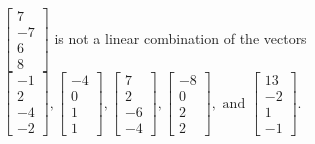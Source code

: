 \begin{exercise}
\begin{exerciseStatement}
  \end{exerciseStatement}
  \begin{exerciseAnswer}
   \(\left[\begin{array}{c}
7 \\
-7 \\
6 \\
8
\end{array}\right]\) 
  	 is not  
	a linear combination of the vectors \(\left[\begin{array}{c}
-1 \\
2 \\
-4 \\
-2
\end{array}\right] , \left[\begin{array}{c}
-4 \\
0 \\
1 \\
1
\end{array}\right] , \left[\begin{array}{c}
7 \\
2 \\
-6 \\
-4
\end{array}\right] , \left[\begin{array}{c}
-8 \\
0 \\
2 \\
2
\end{array}\right] , \text{ and } \left[\begin{array}{c}
13 \\
-2 \\
1 \\
-1
\end{array}\right]\).

	
  


  \end{exerciseAnswer}
\end{exercise}